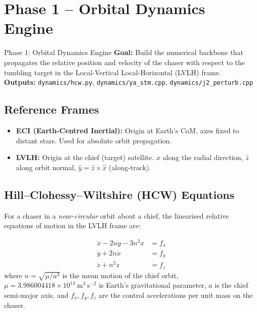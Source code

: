 \documentclass[12pt, a4paper]{article}
\begin{document}
\section{Phase 1 -- Orbital Dynamics Engine}

\begin{phasebox}{Phase 1: Orbital Dynamics Engine}
\textbf{Goal:} Build the numerical backbone that propagates the relative
position and velocity of the chaser with respect to the tumbling target in
the Local-Vertical Local-Horizontal (LVLH) frame.\\[0.5em]
\textbf{Outputs:} \texttt{dynamics/hcw.py}, \texttt{dynamics/ya\_stm.cpp},
\texttt{dynamics/j2\_perturb.cpp}
\end{phasebox}

\subsection{Reference Frames}

\begin{itemize}[leftmargin=2em]
    \item \textbf{ECI (Earth-Centred Inertial):} Origin at Earth's CoM, axes
          fixed to distant stars. Used for absolute orbit propagation.
    \item \textbf{LVLH:} Origin at the chief (target) satellite. $\hat{x}$
          along the radial direction, $\hat{z}$ along orbit normal,
          $\hat{y} = \hat{z} \times \hat{x}$ (along-track).
\end{itemize}

\subsection{Hill--Clohessy--Wiltshire (HCW) Equations}

For a chaser in a \emph{near-circular} orbit about a chief, the linearised
relative equations of motion in the LVLH frame are:

\begin{formulabox}[title=HCW Equations of Relative Motion]
\begin{align}
\ddot{x} - 2n\dot{y} - 3n^2 x &= f_x \label{eq:hcw_x}\\
\ddot{y} + 2n\dot{x}           &= f_y \label{eq:hcw_y}\\
\ddot{z} + n^2 z               &= f_z \label{eq:hcw_z}
\end{align}
where $n = \sqrt{\mu / a^3}$ is the mean motion of the chief orbit,
$\mu = 3.986004418 \times 10^{14}\ \mathrm{m^3\,s^{-2}}$ is Earth's
gravitational parameter, $a$ is the chief semi-major axis, and
$f_x, f_y, f_z$ are the control accelerations per unit mass on the chaser.
\end{formulabox}
\end{document}
